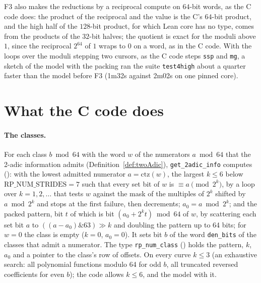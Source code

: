 F3 also makes the reductions by a reciprocal compute on $64$-bit words, as the C code does: the
product of the reciprocal and the value is the C's $64$-bit product, and the high half of the
$128$-bit product, for which Lean core has no type, comes from the products of the $32$-bit halves;
the quotient is exact for the moduli above $1$, since the reciprocal $2^{64}$ of $1$ wraps to $0$ on
a word, as in the C code. With the loops over the moduli stepping two cursors, as the C code steps
\verb|ssp| and \verb|mg|, a sketch of the model with the packing ran the suite \verb|test4high|
about a quarter faster than the model before F3 (1m32s against 2m02s on one pinned core).

\section{What the C code does}\label{sec:packingC}

\paragraph{The classes.} For each class $b \bmod 64$ with the word $w$ of the numerators
$a \bmod 64$ that the 2-adic information admits (Definition~\ref{def:twoAdic}),
\verb|get_2adic_info| computes (): with the lowest admitted
numerator $a = \mathrm{ctz}(w)$, the largest $k \le 6$ below $\mathrm{RP\_NUM\_STRIDES} = 7$ such
that every set bit of $w$ is $\equiv a \pmod{2^k}$, by a loop over $k = 1, 2, \dots$ that tests $w$
against the mask of the multiples of $2^k$ shifted by $a \bmod 2^k$ and stops at the first failure,
then decrements; $a_0 = a \bmod 2^k$; and the packed pattern, bit $t$ of which is bit
$(a_0 + 2^k t) \bmod 64$ of $w$, by scattering each set bit $a$ to
$((a - a_0) \mathbin{\&} 63) \gg k$ and doubling the pattern up to 64 bits; for $w = 0$ the class is
empty ($k = 0$, $a_0 = 0$). It sets bit $b$ of the word \verb|den_bits| of the classes that admit a
numerator. The type \verb|rp_num_class| () holds the pattern, $k$,
$a_0$ and a pointer to the class's row of offsets. On every curve $k \le 3$ (an exhaustive search:
all polynomial functions modulo 64 for odd $b$, all truncated reversed coefficients for even $b$);
the code allows $k \le 6$, and the model with it.

